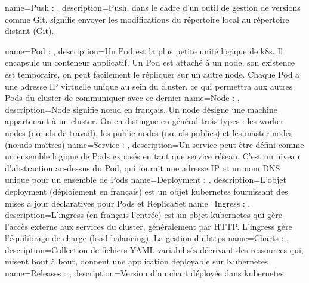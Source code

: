 {
    name=Push : ,
    description={Push, dans le cadre d'un outil de gestion de versions comme Git, signifie envoyer les modifications du répertoire local au répertoire distant (Git).}
}

{
    name=Pod : ,
    description={Un Pod est la plus petite unité logique de k8s. Il encapsule un conteneur applicatif. Un Pod est attaché à un node, son existence est temporaire, on peut facilement le répliquer sur un autre node. Chaque Pod a une adresse IP virtuelle unique au sein du cluster, ce qui permettra aux autres Pods du cluster de communiquer avec ce dernier}
}
{
    name=Node : ,
    description={Node signifie nœud en français. Un node désigne une machine appartenant à un cluster. On en distingue en général trois types : les worker nodes (nœuds de travail), les public nodes (nœuds publics) et les master nodes (nœuds maîtres)}
}
{
    name=Service : ,
    description={Un service peut être défini comme un ensemble logique de Pods exposés en tant que service réseau. C’est un niveau d’abstraction au-dessus du Pod, qui fournit une adresse IP et un nom DNS unique pour un ensemble de Pods}
}
{
    name=Deployment : ,
    description={L'objet deployment (déploiement en français) est un objet kubernetes fournissant des mises à jour déclaratives pour Pods et ReplicaSet}
}
{
    name=Ingress : ,
    description={L'ingress (en français l'entrée) est un objet kubernetes qui gère l'accès externe aux services du cluster, généralement par HTTP. L'ingress gère l'équilibrage de charge (load balancing), La gestion du https}
}
{
    name=Charts : ,
    description={Collection de fichiers YAML variabilisés décrivant des ressources qui, misent bout à bout, donnent une application déployable sur Kubernetes}
}
{
    name=Releases : ,
    description={Version d'un chart déployée dans kubernetes}
}

